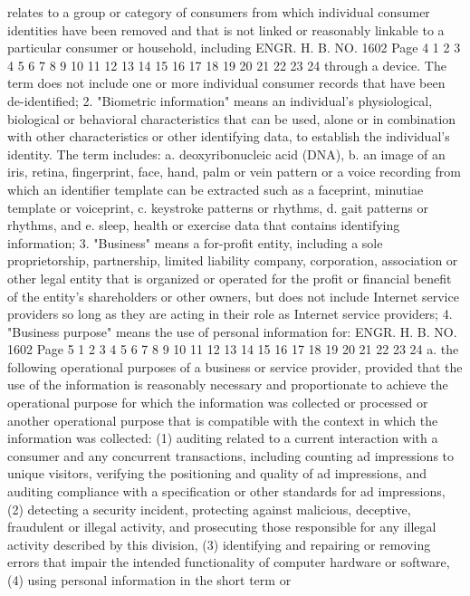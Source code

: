 relates to a group or category of consumers from which individual
consumer identities have been removed and that is not linked or
reasonably linkable to a particular consumer or household, including 
ENGR. H. B. NO. 1602 Page 4
1
2
3
4
5
6
7
8
9
10
11
12
13
14
15
16
17
18
19
20
21
22
23
24
through a device. The term does not include one or more individual
consumer records that have been de-identified;
2. "Biometric information" means an individual's physiological,
biological or behavioral characteristics that can be used, alone or
in combination with other characteristics or other identifying data,
to establish the individual's identity. The term includes:
a. deoxyribonucleic acid (DNA),
b. an image of an iris, retina, fingerprint, face, hand,
palm or vein pattern or a voice recording from which
an identifier template can be extracted such as a
faceprint, minutiae template or voiceprint,
c. keystroke patterns or rhythms,
d. gait patterns or rhythms, and
e. sleep, health or exercise data that contains
identifying information;
3. "Business" means a for-profit entity, including a sole
proprietorship, partnership, limited liability company, corporation,
association or other legal entity that is organized or operated for
the profit or financial benefit of the entity's shareholders or
other owners, but does not include Internet service providers so
long as they are acting in their role as Internet service providers;
4. "Business purpose" means the use of personal information
for:
ENGR. H. B. NO. 1602 Page 5
1
2
3
4
5
6
7
8
9
10
11
12
13
14
15
16
17
18
19
20
21
22
23
24
a. the following operational purposes of a business or
service provider, provided that the use of the
information is reasonably necessary and proportionate
to achieve the operational purpose for which the
information was collected or processed or another
operational purpose that is compatible with the
context in which the information was collected:
(1) auditing related to a current interaction with a
consumer and any concurrent transactions,
including counting ad impressions to unique
visitors, verifying the positioning and quality
of ad impressions, and auditing compliance with a
specification or other standards for ad
impressions,
(2) detecting a security incident, protecting against
malicious, deceptive, fraudulent or illegal
activity, and prosecuting those responsible for
any illegal activity described by this division,
(3) identifying and repairing or removing errors that
impair the intended functionality of computer
hardware or software,
(4) using personal information in the short term or
